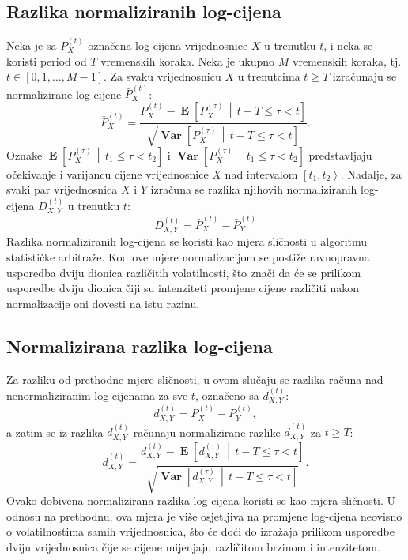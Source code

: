 \documentclass[lmodern, utf8, diplomski, numeric]{fer}
\newcommand{\Efromto}[2]{\operatorname{\mathbf{E}}\left[#1\, \middle\vert\, #2\right]}
\newcommand{\Varfromto}[2]{\operatorname{\mathbf{Var}}\left[#1\, \middle\vert\, #2\right]}
\newcommand{\norm}[1]{\bar{#1}}
\begin{document}
  \subsection{Razlika normaliziranih log-cijena}
  Neka je sa $P_X^{\left(t\right)}$ označena log-cijena vrijednosnice $X$ u trenutku $t$, i neka se koristi period od $T$ vremenskih koraka.
  Neka je ukupno $M$ vremenskih koraka, tj. $t \in \left[0, 1, \ldots, M - 1\right]$.
  Za svaku vrijednosnicu $X$ u trenutcima $t \ge T$ izračunaju se normalizirane log-cijene $\norm{P}_X^{\left(t\right)}$:
  \begin{equation}
  \norm{P}_X^{\left(t\right)} = \frac{P_X^{\left(t\right)} - \Efromto{P_X^{(\tau)}}{t-T \le \tau < t}}{\sqrt{\Varfromto{P_X^{(\tau)}}{t-T \le \tau < t}}}.
  \end{equation}
  Oznake $\Efromto{P_X^{(\tau)}}{t_1 \le \tau < t_2}$ i $\Varfromto{P_X^{(\tau)}}{t_1 \le \tau < t_2}$ predstavljaju očekivanje i varijancu cijene vrijednosnice $X$ nad intervalom $\left[t_1, t_2\right>$.
  Nadalje, za svaki par vrijednosnica $X$ i $Y$ izračuna se razlika njihovih normaliziranih log-cijena $D_{X,Y}^{\left(t\right)}$ u trenutku $t$:
  \begin{equation}
  D_{X,Y}^{\left(t\right)} = \norm{P}_X^{\left(t\right)} - \norm{P}_Y^{\left(t\right)}
  \end{equation}
  Razlika normaliziranih log-cijena se koristi kao mjera sličnosti u algoritmu statističke arbitraže.
  Kod ove mjere normalizacijom se postiže ravnopravna usporedba dviju dionica različitih volatilnosti, što znači da će se prilikom usporedbe dviju dionica čiji su intenziteti promjene cijene različiti nakon normalizacije oni dovesti na istu razinu.
  
  \subsection{Normalizirana razlika log-cijena}
  Za razliku od prethodne mjere sličnosti, u ovom slučaju se razlika računa nad nenormaliziranim log-cijenama za sve $t$, označeno sa $d_{X,Y}^{\left(t\right)}$:
  \begin{equation}
  d_{X,Y}^{\left(t\right)} = P_X^{\left(t\right)} - P_Y^{\left(t\right)},
  \end{equation}
  a zatim se iz razlika $d_{X,Y}^{\left(t\right)}$ računaju normalizirane razlike $\norm{d}_{X,Y}^{\left(t\right)}$ za $t \ge T$:
  \begin{equation}
  \norm{d}_{X,Y}^{\left(t\right)} = \frac{d_{X,Y}^{\left(t\right)} - \Efromto{d_{X,Y}^{(\tau)}}{t-T \le \tau < t}}{\sqrt{\Varfromto{d_{X,Y}^{(\tau)}}{t-T \le \tau < t}}}.
  \end{equation}
  Ovako dobivena normalizirana razlika log-cijena koristi se kao mjera sličnosti.
  U odnosu na prethodnu, ova mjera je više osjetljiva na promjene log-cijena neovisno o volatilnostima samih vrijednosnica, što će doći do izražaja prilikom usporedbe dviju vrijednosnica čije se cijene mijenjaju različitom brzinom i intenzitetom.
  
\end{document}
